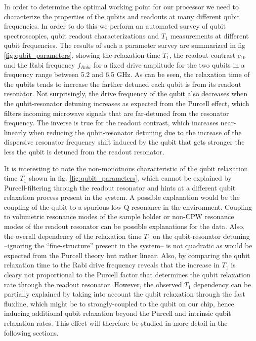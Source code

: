 In order to determine the optimal working point for our processor we need to characterize the properties of the qubits and readouts at many different qubit frequencies. In order to do this we perform an automated survey of qubit spectroscopies, qubit readout characterizations and $T_1$ measurements at different qubit frequencies. The results of such a parameter survey are summarized in fig \ref{fig:qubit_parameters}, showing the relaxation time $T_1$,  the readout contrast $c_{10}$ and the Rabi frequency $f_{Rabi}$ for a fixed drive amplitude for the two qubits in a frequency range between 5.2 and 6.5 GHz. As can be seen, the relaxation time of the qubits tends to increase the farther detuned each qubit is from its readout resonator. Not surprisingly, the drive frequency of the qubit also decreases when the qubit-resonator detuning increases as expected from the Purcell effect, which filters incoming microwave signals that are far-detuned from the resonator frequency. The inverse is true for the readout contrast, which increases near-linearly when reducing the qubit-resonator detuning due to the increase of the dispersive resonator frequency shift induced by the qubit that gets stronger the less the qubit is detuned from the readout resonator.

\smallskip

It is interesting to note the non-monotnous characteristic of the qubit relaxation time $T_1$ shown in fig. \ref{fig:qubit_parameters}, which cannot be explained by Purcell-filtering through the readout resonator and hints at a different qubit relaxation process present in the system. A possible explanation would be the coupling of the qubit to a spurious low-Q resonance in the environment. Coupling to volumetric resonance modes of the sample holder or non-CPW resonance modes of the readout resonator can be possible explanations for the data. Also, the overall dependency of the relaxation time $T_1$ on the qubit-resonator detuning --ignoring the ``fine-structure'' present in the system-- is not quadratic as would be expected from the Purcell theory but rather linear. Also, by comparing the qubit relaxation time to the Rabi drive frequency reveals that the increase in $T_1$ is cleary not proportional to the Purcell factor that determines the qubit relaxation rate through the readout resonator. However, the observed $T_1$ dependency can be partially explained by taking into account the qubit relaxation through the fast fluxline, which might be to strongly-coupled to the qubit on our chip, hence inducing additional qubit relaxation beyond the Purcell and intrinsic qubit relaxation rates. This effect will therefore be studied in more detail in the following sections.

